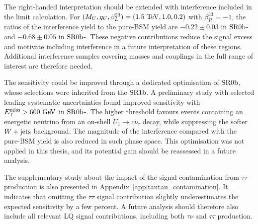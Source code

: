 The right-handed interpretation should be extended with interference included in the limit calculation.
For $(M_U,g_U,\beta_L^{23})=(1.5~\mathrm{TeV},1.0,0.2)$ with $\beta_R^{33}=-1$, the ratios of the interference yield to the pure-BSM yield are $-0.22\pm0.03$ in $\mathrm{SR0b}$-\Res and $-0.68\pm0.05$ in $\mathrm{SR0b}$-\NonRes. These negative contributions reduce the signal excess and motivate including interference in a future interpretation of these regions.
Additional interference samples covering masses and couplings in the full range of interest are therefore needed.

The sensitivity could be improved through a dedicated optimisation of $\mathrm{SR0b}$, whose selections were inherited from the $\mathrm{SR1b}$.
A preliminary study with selected leading systematic uncertainties found improved sensitivity with $E_{\mathrm{T}}^{\mathrm{miss}}>600~\mathrm{GeV}$ in $\mathrm{SR0b}$-\Res.
The higher threshold favours events containing an energetic neutrino from an on-shell $U_1\to c\nu_\tau$ decay, while suppressing the softer $W+\mathrm{jets}$ background.
The magnitude of the interference compared with the pure-BSM yield is also reduced in such phase space.
This optimisation was not applied in this thesis, and its potential gain should be reassessed in a future analysis.

The supplementary study about the impact of the signal contamination from $\tau\tau$ production is also presented in Appendix~\ref{app:tautau_contamination}. It indicates that omitting the $\tau\tau$ signal contribution slightly underestimates the expected sensitivity by a few percent.
A future analysis should therefore also include all relevant LQ signal contributions, including both $\tau\nu$ and $\tau\tau$ production.

